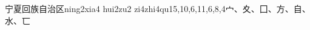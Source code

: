 \begin{EntryWithPhonetic}{宁夏回族自治区}{ning2xia4 hui2zu2 zi4zhi4qu1}{5,10,6,11,6,8,4}{⼧、⼢、⼞、⽅、⾃、⽔、⼖}
\end{EntryWithPhonetic}

